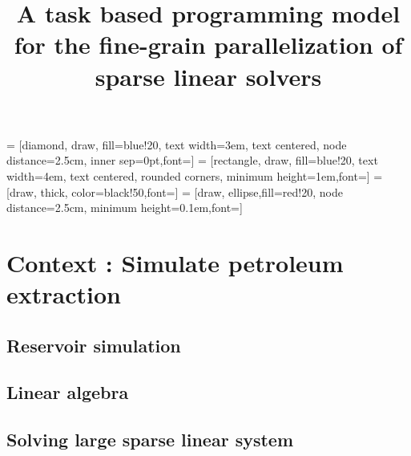 \documentclass[oneside,12t]{classes/Thesis}
\title{A task based programming model for the fine-grain parallelization of sparse linear solvers}
\begin{document}
\dominitoc
{} = [diamond, draw, fill=blue!20,
text width=3em, text centered, node distance=2.5cm, inner sep=0pt,font=\scriptsize]
 = [rectangle, draw, fill=blue!20,
text width=4em, text centered, rounded corners, minimum height=1em,font=\scriptsize]
 = [draw, thick, color=black!50,font=\scriptsize]
 = [draw, ellipse,fill=red!20, node distance=2.5cm,
minimum height=0.1em,font=\scriptsize]

\maketitle

\setcounter{secnumdepth}{3}
\setcounter{tocdepth}{3}

\frontmatter %
%
%
%
\tableofcontents
\mtcaddchapter
\mainmatter %



\chapter{Context : Simulate petroleum extraction}
\minitoc
\vspace{1cm}

\section{Reservoir simulation}




\section{Linear algebra}




\section{Solving large sparse linear system}
\end{document}
